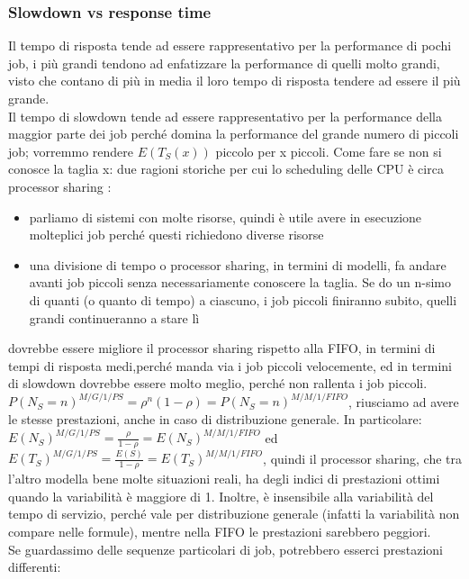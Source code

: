 \documentclass{article}
\begin{document}
\subsubsection{Slowdown vs response time}
Il tempo di risposta tende ad essere rappresentativo per la performance di pochi job, i più grandi tendono ad enfatizzare la performance di quelli molto grandi, visto che contano di più in media il loro tempo di risposta tendere ad essere il più grande.\\ Il tempo di slowdown tende ad essere rappresentativo per la performance della maggior parte dei job perché domina la performance del grande numero di piccoli job; vorremmo rendere $E(T_S(x))$ piccolo per x piccoli. Come fare se non si conosce la taglia x: due ragioni storiche per cui lo scheduling delle CPU è circa processor sharing :
\begin{itemize}
\item parliamo di sistemi con molte risorse, quindi è utile avere in esecuzione molteplici job perché questi richiedono diverse risorse
\item una divisione di tempo o processor sharing, in termini di modelli, fa andare avanti job piccoli senza necessariamente conoscere la taglia. Se do un n-simo di quanti (o quanto di tempo) a ciascuno, i job piccoli finiranno subito, quelli grandi continueranno a stare lì
\end{itemize}
dovrebbe essere migliore il processor sharing rispetto alla FIFO, in termini di tempi di risposta medi,perché manda via i job piccoli velocemente, ed in termini di slowdown dovrebbe essere molto meglio, perché non rallenta i job piccoli. $P(N_S = n)^{M/G/1/PS} = \rho^n (1 - \rho) = P(N_S = n)^{M/M/1/FIFO}$, riusciamo ad avere le stesse prestazioni, anche in caso di distribuzione generale. In particolare: $E(N_S)^{M/G/1/PS} = \frac{\rho}{1 - \rho} = E(N_S)^{M/M/1/FIFO}$ ed $E(T_S)^{M/G/1/PS} = \frac{E(S)}{1 - \rho} = E(T_S)^{M/M/1/FIFO}$, quindi il processor sharing, che tra l'altro modella bene molte situazioni reali, ha degli indici di prestazioni ottimi quando la variabilità è maggiore di 1. Inoltre, è insensibile alla variabilità del tempo di servizio, perché vale per distribuzione generale (infatti la variabilità non compare nelle formule), mentre nella FIFO le prestazioni sarebbero peggiori.\\ Se guardassimo delle sequenze particolari di job, potrebbero esserci prestazioni differenti:\\
\end{document}
